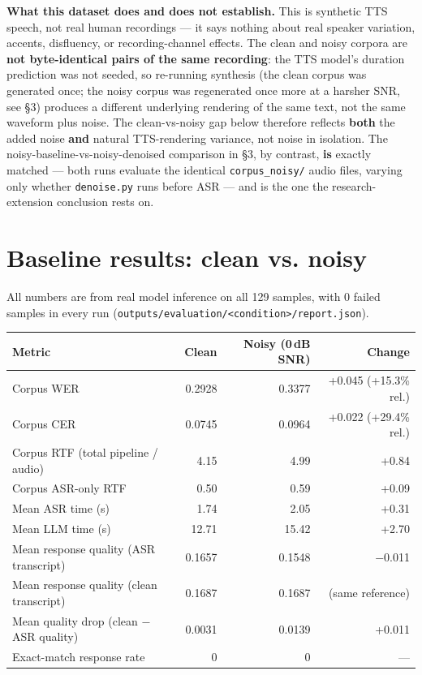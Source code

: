 \documentclass[11pt]{article}
\begin{document}
\textbf{What this dataset does and does not establish.} This is synthetic TTS speech, not real human recordings --- it says nothing about real speaker variation, accents, disfluency, or recording-channel effects. The clean and noisy corpora are \textbf{not byte-identical pairs of the same recording}: the TTS model's duration prediction was not seeded, so re-running synthesis (the clean corpus was generated once; the noisy corpus was regenerated once more at a harsher SNR, see \S3) produces a different underlying rendering of the same text, not the same waveform plus noise. The clean-vs-noisy gap below therefore reflects \textbf{both} the added noise \textbf{and} natural TTS-rendering variance, not noise in isolation. The noisy-baseline-vs-noisy-denoised comparison in \S3, by contrast, \textbf{is} exactly matched --- both runs evaluate the identical \texttt{corpus\_noisy/} audio files, varying only whether \texttt{denoise.py} runs before ASR --- and is the one the research-extension conclusion rests on.

\section{Baseline results: clean vs. noisy}

All numbers are from real model inference on all 129 samples, with 0 failed samples in every run (\texttt{outputs/evaluation/<condition>/report.json}).

\begin{center}
\begin{tabular}{lrrr}
\toprule
Metric & Clean & Noisy (0\,dB SNR) & Change \\
\midrule
Corpus WER & 0.2928 & 0.3377 & +0.045 (+15.3\% rel.) \\
Corpus CER & 0.0745 & 0.0964 & +0.022 (+29.4\% rel.) \\
Corpus RTF (total pipeline / audio) & 4.15 & 4.99 & +0.84 \\
Corpus ASR-only RTF & 0.50 & 0.59 & +0.09 \\
Mean ASR time (s) & 1.74 & 2.05 & +0.31 \\
Mean LLM time (s) & 12.71 & 15.42 & +2.70 \\
Mean response quality (ASR transcript) & 0.1657 & 0.1548 & $-$0.011 \\
Mean response quality (clean transcript) & 0.1687 & 0.1687 & (same reference) \\
Mean quality drop (clean $-$ ASR quality) & 0.0031 & 0.0139 & +0.011 \\
Exact-match response rate & 0 & 0 & --- \\
\bottomrule
\end{tabular}
\end{center}
\end{document}
